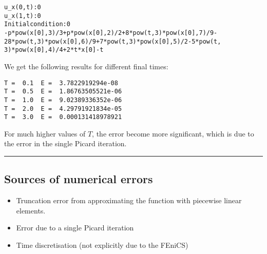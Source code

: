 \documentclass[letterpaper,10pt,english]{/usr/share/sphinx/texinputs/sphinxhowto}
\newenvironment{InvisibleVerbatim}
        {\begin{mdframed}[leftmargin=0.1\linewidth,innerleftmargin=3pt,innerrightmargin=3pt, userdefinedwidth=1\linewidth, linewidth=0pt, linecolor=white, usetwoside=false]}
        {\end{mdframed}}
\begin{document}
    

        
        

            
                \begin{InvisibleVerbatim}
                \vspace{-0.5\baselineskip}
\begin{alltt}u\_x(0,t): 0
u\_x(1,t): 0
Initial condition: 0
-p*pow(x[0], 3)/3 + p*pow(x[0], 2)/2 + 8*pow(t, 3)*pow(x[0], 7)/9 -
28*pow(t, 3)*pow(x[0], 6)/9 + 7*pow(t, 3)*pow(x[0], 5)/2 - 5*pow(t,
3)*pow(x[0], 4)/4 + 2*t*x[0] - t
\end{alltt}

            \end{InvisibleVerbatim}
            
        
    
We get the following results for different final times:

\begin{verbatim}
T =  0.1  E =  3.7822919294e-08
T =  0.5  E =  1.86763505521e-06
T =  1.0  E =  9.02389336352e-06
T =  2.0  E =  4.29791921834e-05
T =  3.0  E =  0.000131418978921
\end{verbatim}

For much higher values of $T$, the error become more significant, which
is due to the error in the single Picard iteration.\begin{center}\rule{3in}{0.4pt}\end{center}

\subsection{Sources of numerical errors}

\begin{itemize}
\item
  Truncation error from approximating the function with piecewise linear
  elements.
\item
  Error due to a single Picard iteration
\item
  Time discretisation (not explicitly due to the FEniCS)
\end{itemize}
        

        \renewcommand{\indexname}{Index}
        \printindex

    
\end{document}
